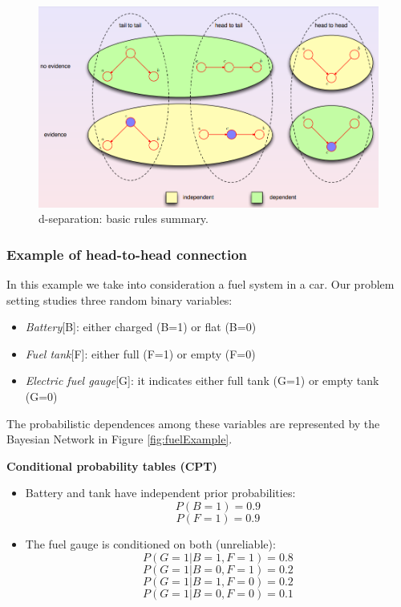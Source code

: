 \begin{figure}
    \centering
    \includegraphics[width=\textwidth]{images/dSeparationSummary.png}
    \caption{d-separation: basic rules summary.}
    \label{fig:basicRulesSummary}
\end{figure}

\subsubsection{Example of head-to-head connection}
In this example we take into consideration a fuel system in a car. Our problem setting studies three random binary variables:
\begin{itemize}
    \item \textit{Battery}[B]: either charged (B=1) or flat (B=0)
    \item \textit{Fuel tank}[F]: either full (F=1) or empty (F=0)
    \item \textit{Electric fuel gauge}[G]: it indicates either full tank (G=1) or empty tank (G=0) 
\end{itemize}
The probabilistic dependences among these variables are represented by the Bayesian Network in Figure \ref{fig:fuelExample}. \newline

\textbf{Conditional probability tables (CPT)}
\begin{itemize}
    \item Battery and tank have independent prior probabilities:
    $$P(B=1) = 0.9$$
    $$P(F=1) = 0.9$$
    \item The fuel gauge is conditioned on both (unreliable):
    $$P(G=1 | B=1, F=1) = 0.8$$
    $$P(G=1 | B=0, F=1) = 0.2$$
    $$P(G=1 | B=1, F=0) = 0.2$$
    $$P(G=1 | B=0, F=0) = 0.1$$
\end{itemize}

